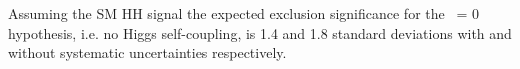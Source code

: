 Assuming the SM HH signal the expected exclusion significance for the \kl\ = 0 hypothesis, i.e. no Higgs self-coupling, is 1.4 and 1.8 standard deviations with and without systematic uncertainties respectively.









